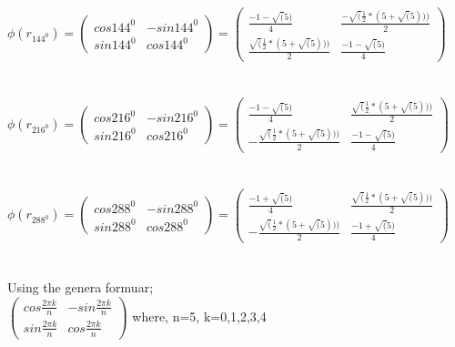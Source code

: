\documentclass{article}
\begin{document}
\\
$\phi (r_{144^0}) = 
\begin{pmatrix}
cos 144^0 & -sin 144^0\\
sin 144^0 & cos144^0
\end{pmatrix} =
\begin{pmatrix}
\frac{-1-\sqrt(5)}{4} & \frac{-\sqrt(\frac{1}{2}*(5+\sqrt(5)))}{2}\\
\frac{\sqrt(\frac{1}{2}*(5+\sqrt(5)))}{2}& \frac{-1-\sqrt(5)}{4}
\end{pmatrix} $\\\\

\\
$\phi (r_{216^0}) = 
\begin{pmatrix}
cos 216^0 & -sin 216^0\\
sin 216^0 & cos216^0
\end{pmatrix} =
\begin{pmatrix}
\frac{-1-\sqrt(5)}{4} & \frac{\sqrt(\frac{1}{2}*(5+\sqrt(5)))}{2}\\
-\frac{\sqrt(\frac{1}{2}*(5+\sqrt(5)))}{2}& \frac{-1-\sqrt(5)}{4}
\end{pmatrix} $\\\\

\\
$\phi (r_{288^0}) = 
\begin{pmatrix}
cos 288^0 & -sin 288^0\\
sin 288^0 & cos288^0
\end{pmatrix} =
\begin{pmatrix}
\frac{-1+\sqrt(5)}{4} & \frac{\sqrt(\frac{1}{2}*(5+\sqrt(5)))}{2}\\
-\frac{\sqrt(\frac{1}{2}*(5+\sqrt(5)))}{2}& \frac{-1+\sqrt(5)}{4}
\end{pmatrix} $\\\\



\\
Using the genera formuar;\\

$\begin{pmatrix}
cos \frac{2 \pi k}{n} & -sin \frac{2 \pi k}{n}\\
sin \frac{2 \pi k}{n} & cos\frac{2 \pi k}{n}
\end{pmatrix}$
where, n=5, k=0,1,2,3,4\\\\
\end{document}
